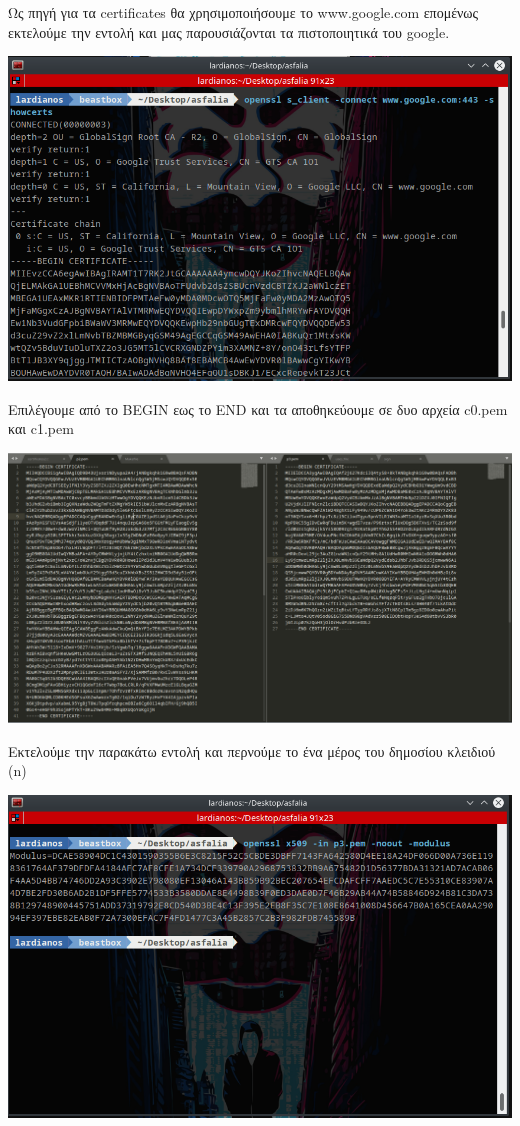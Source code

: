 \noindent
Ως πηγή για τα certificates θα χρησιμοποιήσουμε το www.google.com επομένως
εκτελούμε την εντολή και μας παρουσιάζονται τα πιστοποιητικά του google.
\begin{center}
			\includegraphics[width=1\textwidth]{image/image36term1.PNG}		
\end{center}
\noindent
Επιλέγουμε από το BEGIN εως το END και τα αποθηκεύουμε σε δυο αρχεία c0.pem και c1.pem
\begin{center}
			\includegraphics[width=1\textwidth]{image/image36cert.PNG}		
\end{center}
\noindent
Εκτελούμε την παρακάτω εντολή και περνούμε το ένα μέρος του δημοσίου κλειδιού (n)
\begin{center}
			\includegraphics[width=1\textwidth]{image/image36term2.PNG}		
\end{center}
